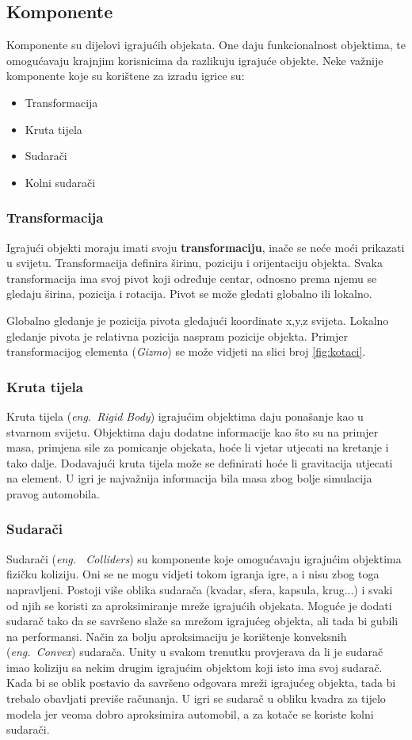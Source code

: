 \subsection{Komponente}
Komponente su dijelovi igrajućih objekata. One daju funkcionalnost objektima, te omogućavaju krajnjim korisnicima da razlikuju igrajuće objekte. Neke važnije komponente koje su korištene za izradu igrice su:
\newpage
\begin{itemize} 
	\item Transformacija
	\item Kruta tijela
	\item Sudarači
	\item Kolni sudarači 
\end{itemize}
\subsubsection{Transformacija}
Igrajući objekti moraju imati svoju \textbf{transformaciju}, inače se neće moći prikazati u svijetu. Transformacija definira širinu, poziciju i orijentaciju objekta. Svaka transformacija ima svoj pivot koji određuje centar, odnosno prema njemu se gledaju širina, pozicija i rotacija. Pivot se može gledati globalno ili lokalno. 
 
Globalno gledanje je pozicija pivota gledajući koordinate x,y,z svijeta. Lokalno gledanje pivota je relativna pozicija naspram pozicije objekta. Primjer transformacijog elementa (\emph{Gizmo}) se može vidjeti na slici broj \ref{fig:kotaci}.

\subsubsection{Kruta tijela}
Kruta tijela (\emph{eng.~Rigid Body}) igrajućim objektima daju ponašanje kao u stvarnom svijetu. Objektima daju dodatne informacije kao što su na primjer masa, primjena sile za pomicanje objekata, hoće li vjetar utjecati na kretanje i tako dalje. Dodavajući kruta tijela može se definirati hoće li gravitacija utjecati na element. U igri je najvažnija informacija bila masa zbog bolje simulacija pravog automobila.
\subsubsection{Sudarači}
Sudarači (\emph{eng.~ Colliders}) su komponente koje omogućavaju igrajućim objektima fizičku koliziju. Oni se ne mogu vidjeti tokom igranja igre, a i nisu zbog toga napravljeni. Postoji više oblika sudarača (kvadar, sfera, kapsula, krug...) i svaki od njih se koristi za aproksimiranje mreže igrajućih objekata. Moguće je dodati sudarač tako da se savršeno slaže sa mrežom igrajućeg objekta, ali tada bi gubili na performansi. Način za bolju aproksimaciju je korištenje konveksnih (\emph{eng.~Convex}) sudarača.
\newpage
Unity u svakom trenutku provjerava da li je sudarač imao koliziju sa nekim drugim igrajućim objektom koji isto ima svoj sudarač. Kada bi se oblik postavio da savršeno odgovara mreži igrajućeg objekta, tada bi trebalo obavljati previše računanja. U igri se sudarač u obliku kvadra za tijelo modela jer veoma dobro aproksimira automobil, a za kotače se koriste kolni sudarači.

